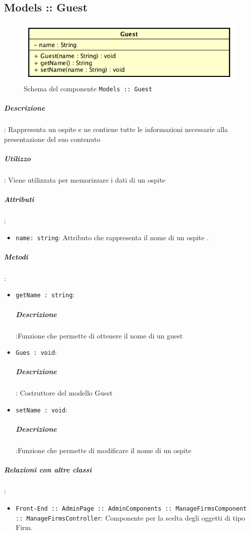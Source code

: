 \documentclass[../ManualeSviluppatore_v2.0.0.tex]{subfiles}
\begin{document}
	\subsection{Models :: Guest}
	\begin{figure}[!h]
		\centering
		\includegraphics[scale=0.6]{Architettura/Front-End/Models/Guest.png}
		\caption{Schema del componente \texttt{Models :: Guest}}
	\end{figure}

		\subparagraph{Descrizione}: Rappresenta un ospite e ne contiene tutte le informazioni necessarie alla presentazione del suo contenuto
		\subparagraph{Utilizzo}: Viene utilizzata per memorizzare i dati di un ospite
		\subparagraph{Attributi}:
		      \begin{itemize}
		      	\item \texttt{name: string}:
		      	      Attributo che rappresenta il nome di un ospite
		      	      .
		      \end{itemize}
		\subparagraph{Metodi}:
		      \begin{itemize}
		      	\item \texttt{getName : string}:
		      	      \subparagraph{Descrizione}:Funzione che permette di ottenere il nome di un guest

		      	\item \texttt{Gues : void}:
		      	     \subparagraph{Descrizione}: Costruttore del modello Guest

		      	\item \texttt{setName : void}:
		      	      \subparagraph{Descrizione}:Funzione che permette di modificare il nome di un ospite
		      \end{itemize}

		\subparagraph{Relazioni con altre classi}:
		      \begin{itemize}
		      	\item \texttt{Front-End :: AdminPage :: AdminComponents :: ManageFirmsComponent :: ManageFirmsController}: Componente per la scelta degli oggetti di tipo Firm.
		      \end{itemize}
\end{document}
